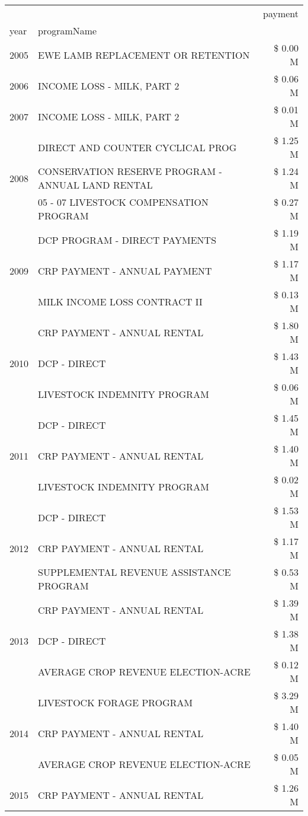 \begin{tabular}{llr}
\toprule
 &  & payment \\
year & programName &  \\
\midrule
2005 & EWE LAMB REPLACEMENT OR RETENTION & \$ 0.00 M \\
\cline{1-3}
2006 & INCOME LOSS - MILK, PART 2 & \$ 0.06 M \\
\cline{1-3}
2007 & INCOME LOSS - MILK, PART 2 & \$ 0.01 M \\
\cline{1-3}
\multirow[t]{3}{*}{2008} & DIRECT AND COUNTER CYCLICAL PROG & \$ 1.25 M \\
 & CONSERVATION RESERVE PROGRAM - ANNUAL LAND RENTAL & \$ 1.24 M \\
 & 05 - 07 LIVESTOCK COMPENSATION PROGRAM & \$ 0.27 M \\
\cline{1-3}
\multirow[t]{3}{*}{2009} & DCP PROGRAM - DIRECT PAYMENTS & \$ 1.19 M \\
 & CRP PAYMENT - ANNUAL PAYMENT & \$ 1.17 M \\
 & MILK INCOME LOSS CONTRACT II & \$ 0.13 M \\
\cline{1-3}
\multirow[t]{3}{*}{2010} & CRP PAYMENT - ANNUAL RENTAL & \$ 1.80 M \\
 & DCP - DIRECT & \$ 1.43 M \\
 & LIVESTOCK INDEMNITY PROGRAM & \$ 0.06 M \\
\cline{1-3}
\multirow[t]{3}{*}{2011} & DCP - DIRECT & \$ 1.45 M \\
 & CRP PAYMENT - ANNUAL RENTAL & \$ 1.40 M \\
 & LIVESTOCK INDEMNITY PROGRAM & \$ 0.02 M \\
\cline{1-3}
\multirow[t]{3}{*}{2012} & DCP - DIRECT & \$ 1.53 M \\
 & CRP PAYMENT - ANNUAL RENTAL & \$ 1.17 M \\
 & SUPPLEMENTAL REVENUE ASSISTANCE PROGRAM & \$ 0.53 M \\
\cline{1-3}
\multirow[t]{3}{*}{2013} & CRP PAYMENT - ANNUAL RENTAL & \$ 1.39 M \\
 & DCP - DIRECT & \$ 1.38 M \\
 & AVERAGE CROP REVENUE ELECTION-ACRE & \$ 0.12 M \\
\cline{1-3}
\multirow[t]{3}{*}{2014} & LIVESTOCK FORAGE PROGRAM & \$ 3.29 M \\
 & CRP PAYMENT - ANNUAL RENTAL & \$ 1.40 M \\
 & AVERAGE CROP REVENUE ELECTION-ACRE & \$ 0.05 M \\
\cline{1-3}
\multirow[t]{3}{*}{2015} & CRP PAYMENT - ANNUAL RENTAL & \$ 1.26 M \\

\end{tabular}
